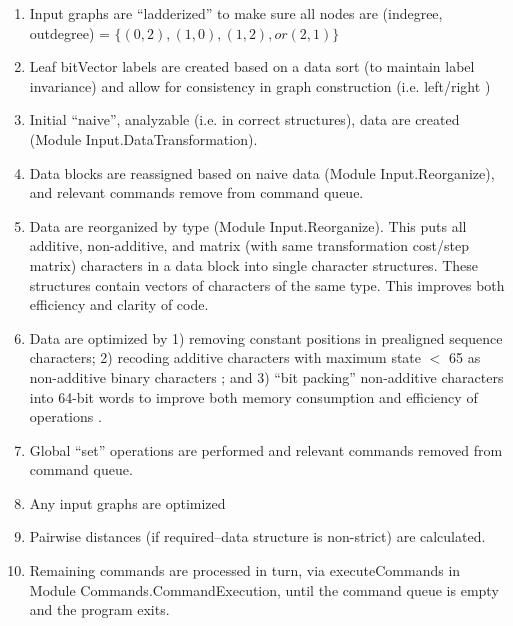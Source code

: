\documentclass[11pt]{article}
\begin{document}
\begin{enumerate}
		\item{Input graphs are ``ladderized'' to make sure all nodes are (indegree, outdegree) = $\{(0,2), (1,0), (1,2), or (2,1)\}$}
		
		\item{Leaf bitVector labels are created based on a data sort (to maintain label invariance) and allow for consistency 
			in graph construction (i.e. left/right \cite{WashburnandWheeler2020})}
		
		\item{Initial ``naive'', analyzable (i.e. in correct structures), data are created (Module Input.DataTransformation).}
		
		\item{Data blocks are reassigned based on naive data (Module Input.Reorganize), and relevant commands remove from command queue.}
		
		\item{Data are reorganized by type (Module Input.Reorganize).  This puts all additive, non-additive, and matrix (with same 
			transformation cost/step matrix) characters in a data block into single character structures.  These structures contain vectors of 
			characters of the same type.  
			This improves both efficiency and clarity of code.} 
		
		\item{Data are optimized by 1) removing constant positions in prealigned sequence characters; 2) recoding additive characters with maximum state $<$ 65 
			 as non-additive binary characters \cite{Farris1970}; and 3) ``bit packing'' non-additive characters into 64-bit words to improve both memory consumption
			 and efficiency of operations \cite{Ronquist1998, moilanen1999, goloboff2002, WhiteandHolland2011}.}
		
		\item{Global ``set'' operations are performed and relevant commands
			removed from command queue.}
		
		\item{Any input graphs are optimized}
		
		\item{Pairwise distances (if required--data structure is non-strict) are calculated.}
		
		\item{Remaining commands are processed in turn, via executeCommands in Module 
			Commands.CommandExecution, until the command queue is empty
			and the program exits.}
		
	\end{enumerate} 
	
\end{document}
